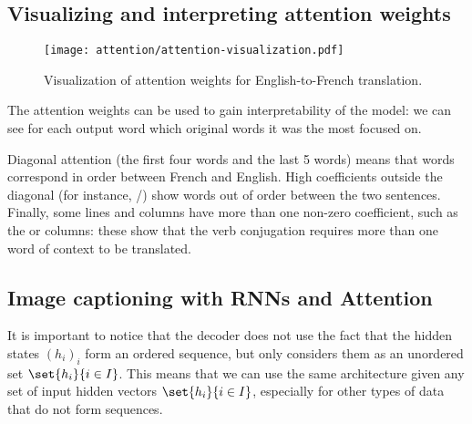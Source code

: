 \subsection{Visualizing and interpreting attention weights}
\begin{wrapfigure}[14]{r}{.45\textwidth}
    \captionsetup{justification=raggedleft}
    \centering
    \texttt{[image: attention/attention-visualization.pdf]}
    \caption{Visualization of attention weights for English-to-French translation.\protect\footnotemark}
\end{wrapfigure}
The attention weights can be used to gain interpretability of the model: we can see for each output word which original words it was the most focused on.  

Diagonal attention (the first four words and the last 5 words) means that words correspond in order between French and English. High coefficients outside the diagonal (for instance, /) show words out of order between the two sentences. Finally, some lines and columns have more than one non-zero coefficient, such as the  or  columns: these show that the verb conjugation requires more than one word of context to be translated.

\newpage
\subsection{Image captioning with RNNs and Attention}
It is important to notice that the decoder does not use the fact that the hidden states $(h_i)_i$ form an ordered sequence, but only considers them as an unordered set $\set{h_i}{i\in I}$. This means that we can use the same architecture given any set of input hidden vectors $\set{h_i}{i\in I}$, especially for other types of data that do not form sequences.

